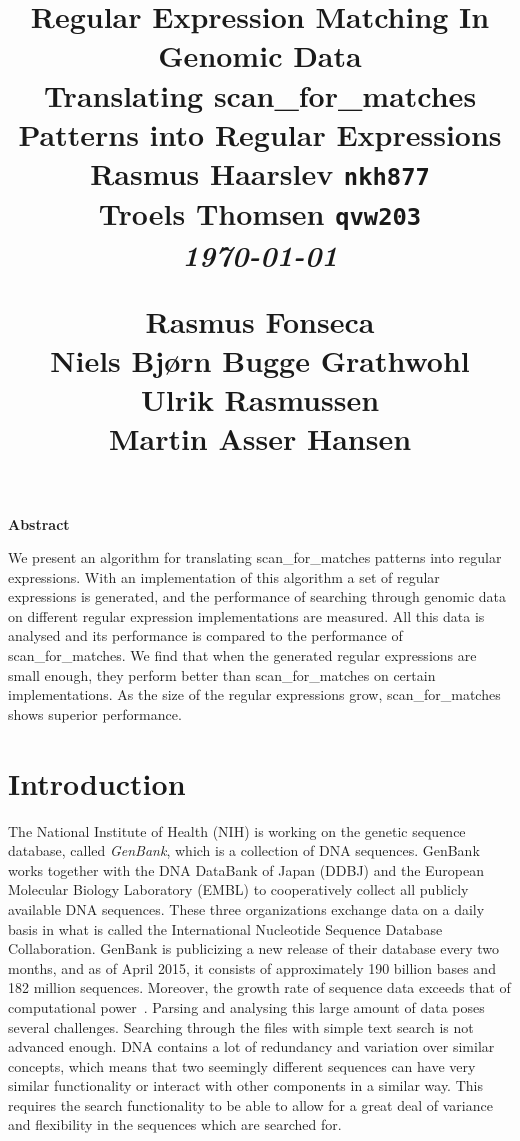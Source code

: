 \documentclass[12pt]{article}
\title{
  \vspace{4cm}
  \Large{\textbf{Regular Expression Matching In Genomic Data}} \\
  \vspace{0.3cm}
  \large{Translating scan\_for\_matches Patterns into Regular Expressions} \\
  \vspace{1cm}
  \normalsize 
  Rasmus Haarslev \texttt{nkh877} \\
  Troels Thomsen \texttt{qvw203} \\
  \textit{\small \today}
  \begin{flushleft}
  \vspace{10cm}
  \small
  {Rasmus Fonseca\\
   Niels Bjørn Bugge Grathwohl\\
   Ulrik Rasmussen\\
   Martin Asser Hansen}
  \end{flushleft}
}
\date{
}
\theoremstyle{definition}
\def \ColourPDF {include/ku-farve}
\def \TitlePDF {include/nat-en}  %
\begin{document}

\clearpage
{}
\thispagestyle{empty}
\maketitle

\begin{center}
\textbf{Abstract}
\end{center}

\vspace{0.5cm}

We present an algorithm for translating scan\_for\_matches patterns into regular expressions. With an implementation of this algorithm a set of regular expressions is generated, and the performance of searching through genomic data on different regular expression implementations are measured. All this data is analysed and its performance is compared to the performance of scan\_for\_matches. We find that when the generated regular expressions are small enough, they perform better than scan\_for\_matches on certain implementations. As the size of the regular expressions grow, scan\_for\_matches shows superior performance.

\newpage

\tableofcontents
\newpage

\pagestyle{fancy}
\fancyhf{}
\rhead{\today}
\cfoot{\thepage}


\section{Introduction}

The National Institute of Health (NIH) is working on the genetic sequence database, called \emph{GenBank}, which is a collection of DNA sequences. GenBank works together with the DNA DataBank of Japan (DDBJ) and the European Molecular Biology Laboratory (EMBL) to cooperatively collect all publicly available DNA sequences. These three organizations exchange data on a daily basis in what is called the International Nucleotide Sequence Database Collaboration. GenBank is publicizing a new release of their database every two months, and as of April 2015, it consists of approximately 190 billion bases and 182 million sequences. Moreover, the growth rate of sequence data exceeds that of computational power~\cite{GenBank}. Parsing and analysing this large amount of data poses several challenges. Searching through the files with simple text search is not advanced enough. DNA contains a lot of redundancy and variation over similar concepts, which means that two seemingly different sequences can have very similar functionality or interact with other components in a similar way. This requires the search functionality to be able to allow for a great deal of variance and flexibility in the sequences which are searched for.
\end{document}
